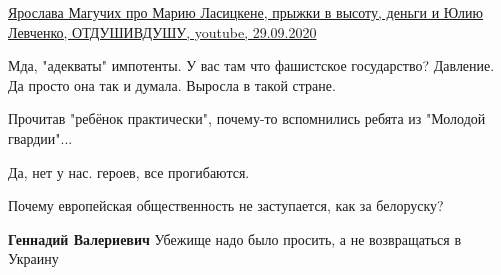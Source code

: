\begin{itemize}
\href{https://www.youtube.com/watch?v=tNSr6NmhRG4}{%
Ярослава Магучих про Марию Ласицкене, прыжки в высоту, деньги и Юлию Левченко, %
ОТДУШИВДУШУ, youtube, 29.09.2020%
}

 
Мда, "адекваты" импотенты. У вас там что фашистское государство? Давление. Да просто она так и думала. Выросла в такой стране.

 
Прочитав "ребёнок практически", почему-то вспомнились ребята из "Молодой гвардии"...

 
Да, нет у нас. героев, все прогибаются.

 
Почему европейская общественность не заступается, как за белоруску?

\begin{itemize}
 
\textbf{Геннадий Валериевич} Убежище надо было просить, а не возвращаться в Украину🧐
\end{itemize}

 

\end{itemize}
